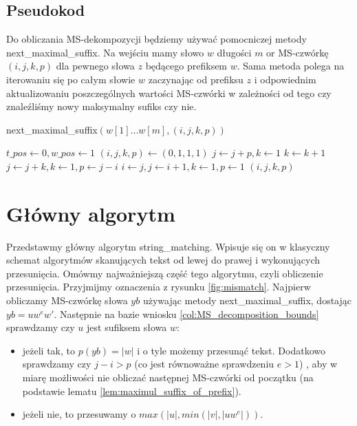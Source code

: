 \documentclass[a4paper,11pt]{article}
\theoremstyle{definition}
\begin{document}
\subsection{Pseudokod}

Do obliczania MS-dekompozycji będziemy używać pomocniczej metody next\_maximal\_suffix. Na wejściu mamy słowo $w$ długości $m$ or MS-czwórkę $(i,j,k,p)$ dla pewnego słowa $z$ będącego prefiksem $w$. Sama metoda polega na iterowaniu się po całym słowie $w$ zaczynając od prefiksu $z$ i odpowiednim aktualizowaniu poszczególnych wartości MS-czwórki w zależności od tego czy znaleźliśmy nowy maksymalny sufiks czy nie.

\begin{algorithm}[H]
\caption{next\_maximal\_suffix$(w[1] \ldots w[m], (i, j, k, p))$}\label{alg:next_maximal_suffix}
\begin{algorithmic} 
\STATE $t\_pos \gets 0,  w\_pos \gets 1$
\STATE $(i,j,k,p) \gets (0,1,1,1)$
            \STATE $j \gets j + p, k \gets 1$
        \ELSE
            \STATE $k \gets k + 1$
        \ENDIF
        \STATE $j \gets j + k, k \gets 1, p \gets j - i$
    \ELSE
        \STATE $i \gets j, j \gets i + 1, k \gets 1, p \gets 1$
    \ENDIF
\ENDWHILE
\RETURN $(i, j, k, p)$

\end{algorithmic}
\end{algorithm}

\section{Główny algorytm}
Przedstawmy główny algorytm string\_matching. Wpisuje się on w klasyczny schemat algorytmów skanujących tekst od lewej do prawej i wykonujących przesunięcia. Omówmy najważniejszą część tego algorytmu, czyli obliczenie przesunięcia. Przyjmijmy oznaczenia z rysunku \ref{fig:mismatch}. Najpierw obliczamy MS-czwórkę słowa $yb$ używając metody next\_maximal\_suffix, dostając $yb = uw^ew'$. Następnie na bazie wniosku \ref{col:MS_decomposition_bounds} sprawdzamy czy $u$ jest sufiksem słowa $w$:
\begin{itemize}
    \item jeżeli tak, to $p(yb) = |w|$ i o tyle możemy przesunąć tekst. Dodatkowo sprawdzamy czy $j - i > p$ (co jest równoważne sprawdzeniu $e > 1$) , aby w miarę możliwości nie obliczać następnej MS-czwórki od początku (na podstawie lematu \ref{lem:maximul_suffix_of_prefix}). 
    \item jeżeli nie, to przesuwamy o $max(|u|, min(|v|, |uw^e|))$.
\end{itemize}
\end{document}
